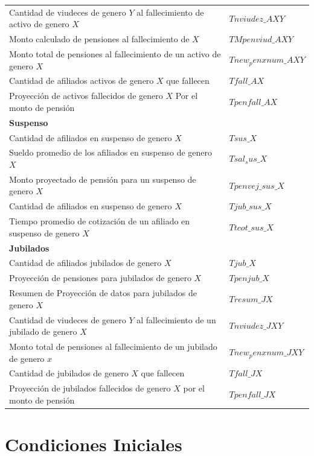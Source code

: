 \documentclass[
  letterpaper,
  DIV=11,
  numbers=noendperiod]{scrreprt}
\begin{document}
\begin{longtable}[]{@{}
  >{\raggedright\arraybackslash}p{}
  >{\raggedright\arraybackslash}p{}@{}}
Cantidad de viudeces de genero \(Y\) al fallecimiento de activo de
genero \(X\) & \(Tnviudez\_AXY\) \\
Monto calculado de pensiones al fallecimiento de \(X\) &
\(TMpenviud\_AXY\) \\
Monto total de pensiones al fallecimiento de un activo de genero \(X\) &
\(Tnew_penxnum\_AXY\) \\
Cantidad de afiliados activos de genero \(X\) que fallecen &
\(Tfall\_AX\) \\
Proyección de activos fallecidos de genero \(X\) Por el monto de pensión
& \(Tpenfall\_AX\) \\
\textbf{Suspenso} & \\
Cantidad de afiliados en suspenso de genero \(X\) & \(Tsus\_X\) \\
Sueldo promedio de los afiliados en suspenso de genero \(X\) &
\(Tsal_sus\_X\) \\
Monto proyectado de pensión para un suspenso de genero \(X\) &
\(Tpenvej\_sus\_X\) \\
Cantidad de afiliados en suspenso de genero \(X\) & \(Tjub\_sus\_X\) \\
Tiempo promedio de cotización de un afiliado en suspenso de genero \(X\)
& \(Ttcot\_sus\_X\) \\
\textbf{Jubilados} & \\
Cantidad de afiliados jubilados de genero \(X\) & \(Tjub\_X\) \\
Proyección de pensiones para jubilados de genero \(X\) &
\(Tpenjub\_X\) \\
Resumen de Proyección de datos para jubilados de genero \(X\) &
\(Tresum\_JX\) \\
Cantidad de viudeces de genero \(Y\) al fallecimiento de un jubilado de
genero \(X\) & \(Tnviudez\_JXY\) \\
Monto total de pensiones al fallecimiento de un jubilado de genero \(x\)
& \(Tnew_penxnum\_JXY\) \\
Cantidad de jubilados de genero \(X\) que fallecen & \(Tfall\_JX\) \\
Proyección de jubilados fallecidos de genero \(X\) por el monto de
pensión & \(Tpenfall\_JX\) \\
\end{longtable}


\hypertarget{condiciones-iniciales}{%
\chapter{Condiciones Iniciales}\label{condiciones-iniciales}}
\end{document}
